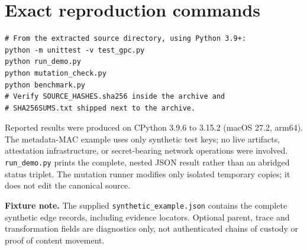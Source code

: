\documentclass[11pt,letterpaper]{article}
\newcommand{\code}[1]{\texttt{#1}}
\begin{document}
\appendix
\section{Exact reproduction commands}
\begin{lstlisting}
# From the extracted source directory, using Python 3.9+:
python -m unittest -v test_gpc.py
python run_demo.py
python mutation_check.py
python benchmark.py
# Verify SOURCE_HASHES.sha256 inside the archive and
# SHA256SUMS.txt shipped next to the archive.
\end{lstlisting}
Reported results were produced on CPython 3.9.6 to 3.15.2 (macOS 27.2, arm64). The metadata-MAC example uses only synthetic test keys; no live artifacts, attestation infrastructure, or secret-bearing network operations were involved. \code{run\_demo.py} prints the complete, nested JSON result rather than an abridged status triplet. The mutation runner modifies only isolated temporary copies; it does not edit the canonical source.

\textbf{Fixture note.} The supplied \code{synthetic\_example.json} contains the complete synthetic edge records, including evidence locators. Optional parent, trace and transformation fields are diagnostics only, not authenticated chains of custody or proof of content movement.
\end{document}
